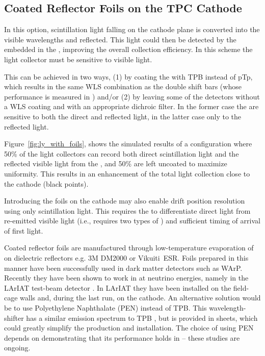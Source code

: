 \subsection{Coated Reflector Foils on the TPC Cathode}
\label{sec:fdsp-pd-enh-cathode}

In this option, scintillation light falling on the cathode plane is converted into the visible wavelengths and reflected. This light %
could then be detected by the  embedded in the , improving the overall collection efficiency. In this scheme the light collector must be sensitive to visible light. 

This can be achieved in two ways, (1) by coating the  with TPB instead of pTp, which results in the same WLS combination as the double shift bars (whose performance is measured in )
and/or (2) by leaving some of the  detectors without a %
WLS coating and with an appropriate dichroic filter. In the former case the   are sensitive to both the direct and reflected light, in the latter case only to the reflected light. 

Figure~\ref{fig:ly_with_foils}, shows the simulated results of a configuration where 50\% of the  light collectors can %
record both direct scintillation light and the reflected visible light from the ,  and 50\% are left uncoated to maximize uniformity. This results in an enhancement of the total light collection close to the cathode (black points). %

Introducing the foils on the cathode may also enable drift position resolution using only scintillation light. This requires the  to %
differentiate direct  light from re-emitted visible light (i.e., requires two %
types of ) and %
sufficient timing of arrival of first light.

Coated reflector foils are manufactured through low-temperature evaporation of  on dielectric reflectors e.g. 3M DM2000 or Vikuiti\texttrademark\  ESR. Foils prepared in this manner have been successfully used in dark matter detectors such as WArP\cite{Acciarri:2008kv}. Recently they have been shown to work in  at neutrino energies, namely  in the LArIAT test-beam detector \cite{Garcia-Gamez:2017cmu}. In LArIAT they have been installed on the field-cage walls and, during the last run, on the cathode. An alternative solution would be to use Polyethylene Naphthalate (PEN) instead of TPB. This wavelength-shifter has a similar emission spectrum to TPB \cite{Kuzniak:2018dcf}, but is provided in sheets, which could greatly simplify the production and installation. The choice of using PEN depends on demonstrating that its performance holds in \lar -- these studies are ongoing. 

